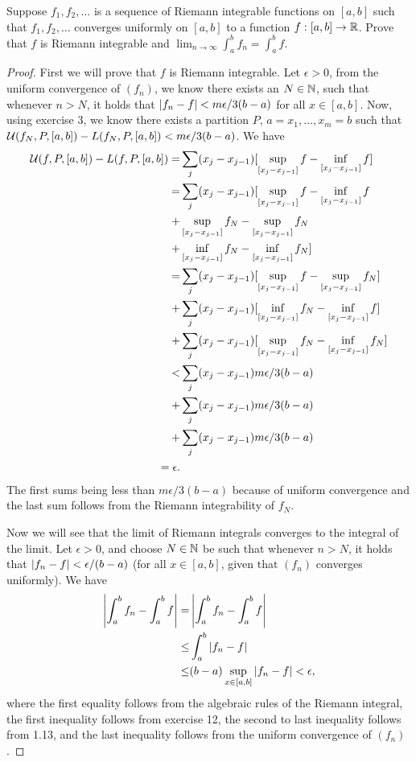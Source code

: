 \begin{exercise}{14}
Suppose $f_1, f_2,\dots$ is a sequence of Riemann integrable functions on $[a,b]$ such that $f_1,f_2,\dots$ converges uniformly on $[a,b]$ to a function $f:[a,b]\to\mathbb{R}$.
Prove that $f$ is Riemann integrable and $\lim_{n\to\infty}\int_a^b f_n = \int_a^b f$.
\end{exercise}
\begin{proof}
First we will prove that $f$ is Riemann integrable.
Let $\epsilon>0$, from the uniform convergence of $(f_n)$, we know there exists an $N\in\mathbb{N}$, such that whenever $n>N$, it holds that $\left\lvert f_n-f\right\rvert<m\epsilon/3(b-a)$ for all $x\in [a,b]$.
Now, using exercise 3, we know there exists a partition $P$, $a=x_1,\dots,x_m=b$ such that $\mathcal{U}(f_N,P,[a,b])-L(f_N,P,[a,b])<m\epsilon/3(b-a)$.
We have
\begin{align*}
    \mathcal{U}(f,P,[a,b]) - L(f,P,[a,b])
    =&  \sum_j (x_j-x_{j-1})[\sup_{[x_j-x_{j-1}]} f - \inf_{[x_j-x_{j-1}]}f]\\
    =&  \sum_j (x_j-x_{j-1})
    [\sup_{[x_j-x_{j-1}]} f - \inf_{[x_j-x_{j-1}]}f\\
    +& \sup_{[x_j-x_{j-1}]} f_N - \sup_{[x_j-x_{j-1}]}f_N\\
    +& \inf_{[x_j-x_{j-1}]} f_N - \inf_{[x_j-x_{j-1}]}f_N]\\
    =&  \sum_j (x_j-x_{j-1})
    [\sup_{[x_j-x_{j-1}]} f - \sup_{[x_j-x_{j-1}]}f_N] \\
    +& \sum_j (x_j-x_{j-1}) 
    [\inf_{[x_j-x_{j-1}]} f_N - \inf_{[x_j-x_{j-1}]}f] \\
    +& \sum_j (x_j-x_{j-1})
    [\sup_{[x_j-x_{j-1}]} f_N - \inf_{[x_j-x_{j-1}]}f_N]\\
    <& \sum_j (x_j-x_{j-1}) m\epsilon/3(b-a)\\
    +& \sum_j (x_j-x_{j-1}) m\epsilon/3(b-a)\\
    +& \sum_j (x_j-x_{j-1}) m\epsilon/3(b-a)\\
    = \epsilon.
\end{align*}
The first sums being less than $m\epsilon/3(b-a)$ because of uniform convergence and the last sum follows from the Riemann integrability of $f_N$.

Now we will see that the limit of Riemann integrals converges to the integral of the limit.
Let $\epsilon>0$, and choose $N\in\mathbb{N}$ be such that whenever $n>N$, it holds that $\left\lvert f_n - f\right\rvert < \epsilon/(b-a)$ (for all $x\in[a,b]$, given that $(f_n)$ converges uniformly).
We have
\begin{align*}
    \left\lvert \int_a^b f_n - \int_a^b f\right\rvert
    =& \left\lvert \int_a^b f_n - \int_a^b f\right\rvert\\
    \leq& \int_a^b \left\lvert f_n - f\right\rvert\\
    \leq& (b-a)\sup_{x\in[a,b]}\left\lvert f_n - f\right\rvert 
    < \epsilon,
\end{align*}
where the first equality follows from the algebraic rules of the Riemann integral, the first inequality follows from exercise 12, the second to last inequality follows from 1.13, and the last inequality follows from the uniform convergence of $(f_n)$.
\end{proof} 

